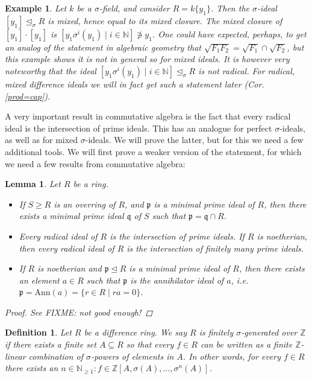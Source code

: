 \documentclass{article}
\def\NE{\mathbb{N}_{\geq1}}
\def\N{\mathbb{N}}
\def\Z{\mathbb{Z}}
\def\p{\mathfrak{p}}
\def\q{\mathfrak{q}}
\def\s{\sigma}
\def\si{\unlhd_{\sigma}}
\newenvironment{bew}{\begin{proof}[Proof]}{\end{proof}}
\theoremstyle{plain}
\newtheorem{ex}[Satz]{Example}
\newtheorem{lem}[Satz]{Lemma}
\newtheorem{defn}[Satz]{Definition}
\theoremstyle{definition}
\begin{document}
\begin{ex} %
Let $k$ be a $\s$-field, and consider $R = k\{y_1\}$. Then the $\s$-ideal $[y_1] \si R$ is mixed, hence equal to its mixed closure.
The mixed closure of $[y_1] \cdot [y_1]$ is $[ y_1 \s^i(y_1) \mid i \in \N ] \not \ni y_1$.
One could have expected, perhaps, to get an analog of the statement in algebraic geometry that $\sqrt{F_1  F_2 } = \sqrt{F_1} \cap \sqrt{F_2}$, but this example shows it is not in general so for mixed ideals.
It is however very noteworthy that the ideal $[ y_1 \s^i(y_1) \mid i \in \N ] \si R$ is not radical. For radical, mixed difference ideals we will in fact get such a statement later (Cor. \ref{prod=cap}).
\end{ex}

A very important result in commutative algebra is the fact that every radical ideal is the intersection of prime ideals. This has an analogue for perfect $\s$-ideals, as well as for mixed $\s$-ideals. 
We will prove the latter, but for this we need a few additional tools. We will first prove a weaker version of the statement, for which we need a few results from commutative algebra:

\begin{lem}\label{commalg}
Let $R$ be a ring. 
\begin{itemize}
\item If $S \geq R$ is an overring of $R$, and $\p$ is a minimal prime ideal of $R$, then there exists a minimal prime ideal $\q$ of $S$ such that $\p = \q \cap R$.
\item Every radical ideal of $R$ is the intersection of prime ideals. If $R$ is noetherian, then every radical ideal of $R$ is the intersection of finitely many prime ideals.
\item If $R$ is noetherian and $\p \unlhd R$ is a minimal prime ideal of $R$, then there exists an element $a \in R$ such that $\p$ is the annihilator ideal of $a$, i.e. $\p = \text{Ann}(a) = \{ r \in R \mid ra = 0 \}$.
\end{itemize}
\begin{bew}
See \cite{wibmer} FIXME: not good enough!
\end{bew}
\end{lem}

\begin{defn}
Let $R$ be a difference ring. We say $R$ is \emph{finitely $\s$-generated over $\Z$} if there exists a finite set $A \subseteq R$ so that every $f \in R$ can be written as a finite $\Z$-linear combination of $\s$-powers of elements in $A$. In other words,
for every $f \in R$ there exists an $n \in \NE: f \in \Z[A,\sigma(A),\ldots,\s^n(A)]$.
\end{defn}\index{finitely $\s$-generated over $\Z$}
\end{document}
